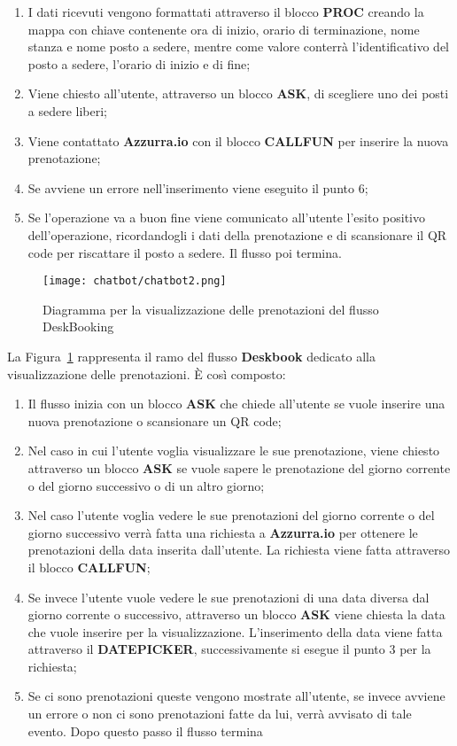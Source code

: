 \begin{enumerate}
	\item I dati ricevuti vengono formattati attraverso il blocco \textbf{PROC} creando la mappa con chiave contenente ora di inizio, orario di terminazione, nome stanza e nome posto a sedere, mentre come valore conterrà l'identificativo del posto a sedere, l'orario di inizio e di fine;
	\item Viene chiesto all'utente, attraverso un blocco \textbf{ASK}, di scegliere uno dei posti a sedere liberi;
	\item Viene contattato \textbf{Azzurra.io} con il blocco \textbf{CALLFUN} per inserire la nuova prenotazione;
	\item Se avviene un errore nell'inserimento viene eseguito il punto 6;
	\item Se l'operazione va a buon fine viene comunicato all'utente l'esito positivo dell'operazione, ricordandogli i dati della prenotazione e di scansionare il QR code per riscattare il posto a sedere. Il flusso poi termina.
\end{enumerate}

\begin{figure}[h]
	\centering
	\texttt{[image: chatbot/chatbot2.png]}
	\caption{Diagramma per la visualizzazione delle prenotazioni del flusso DeskBooking}\label{fig:vis}
\end{figure}

La Figura~\ref{fig:vis} rappresenta il ramo del flusso \textbf{Deskbook} dedicato alla visualizzazione delle prenotazioni. È così composto:
\begin{enumerate}
	\item Il flusso inizia con un blocco \textbf{ASK} che chiede all'utente se vuole inserire una nuova prenotazione o scansionare un QR code;
	\item Nel caso in cui l'utente voglia visualizzare le sue prenotazione, viene chiesto attraverso un blocco \textbf{ASK} se vuole sapere le prenotazione del giorno corrente o del giorno successivo o di un altro giorno;
	\item Nel caso l'utente voglia vedere le sue prenotazioni del giorno corrente o del giorno successivo verrà fatta una richiesta a \textbf{Azzurra.io} per ottenere le prenotazioni della data inserita dall'utente. La richiesta viene fatta attraverso il blocco \textbf{CALLFUN};
	\item Se invece l'utente vuole vedere le sue prenotazioni di una data diversa dal giorno corrente o successivo, attraverso un blocco \textbf{ASK} viene chiesta la data che vuole inserire per la visualizzazione. L'inserimento della data viene fatta attraverso il \textbf{DATEPICKER}, successivamente si esegue il punto 3 per la richiesta;
	\item Se ci sono prenotazioni queste vengono mostrate all'utente, se invece avviene un errore o non ci sono prenotazioni fatte da lui, verrà avvisato di tale evento. Dopo questo passo il flusso termina\\
\end{enumerate}

